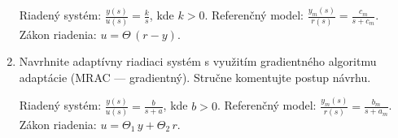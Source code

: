 \documentclass[a4paper, 10pt, ]{article}
\begin{document}
\begin{enumerate}
	Riadený systém: $\displaystyle \frac{y(s)}{u(s)} = \frac{k}{s}$, kde $k>0$. Referenčný model: $\displaystyle \frac{y_m(s)}{r(s)} = \frac{c_m}{s + c_m}$. Zákon riadenia: $u = \Theta\,(r - y)$.



	\item Navrhnite adaptívny riadiaci systém s využitím gradientného algoritmu adaptácie (MRAC --- gradientný). Stručne komentujte postup návrhu.

	Riadený systém: $\displaystyle \frac{y(s)}{u(s)} = \frac{b}{s + a}$, kde $b>0$. Referenčný model: $\displaystyle \frac{y_m(s)}{r(s)} = \frac{b_m}{s + a_m}$. Zákon riadenia: $u = \Theta_1 \, y + \Theta_2 \, r$.

\end{enumerate}
\end{document}
